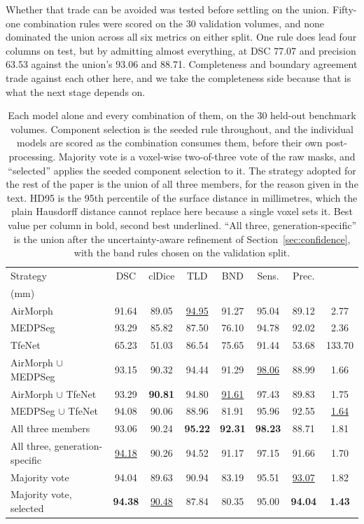 \documentclass[runningheads]{llncs}
\newcommand{\hd}[1]{\makecell[c]{#1}}
\begin{document}
Whether that trade can be avoided was tested before settling on the union.
Fifty-one combination rules were scored on the 30 validation volumes, and none
dominated the union across all six metrics on either split. One rule does lead
four columns on test, but by admitting almost everything, at DSC 77.07 and
precision 63.53 against the union's 93.06 and 88.71. Completeness and boundary
agreement trade against each other here, and we take the completeness side
because that is what the next stage depends on.

\begin{table}[tbp]
\centering
\caption{Each model alone and every combination of them, on the 30 held-out
benchmark volumes. Component selection is the seeded rule throughout, and the
individual models are scored as the combination consumes them, before their own
post-processing. Majority vote is a voxel-wise two-of-three vote of the raw
masks, and ``selected'' applies the seeded component selection to it. The
strategy adopted for the rest of the paper is the union of all three members,
for the reason given in the text. HD95 is the 95th
percentile of the surface distance in millimetres, which the plain Hausdorff
distance cannot replace here because a single voxel sets it. Best value per
column in bold, second best underlined. ``All three, generation-specific'' is the union after the uncertainty-aware refinement of Section~\ref{sec:confidence}, with the band rules chosen on the validation split.}
\label{tab:variants}
\setlength{\tabcolsep}{3.5pt}\footnotesize
\begin{tabular}{@{}lccccccc@{}}
\toprule
Strategy & DSC & clDice & TLD & BND & Sens. & Prec. & \hd{HD95\\(mm)} \\
\midrule
AirMorph & 91.64 & 89.05 & \underline{94.95} & 91.27 & 95.04 & 89.12 & 2.77 \\
MEDPSeg & 93.29 & 85.82 & 87.50 & 76.10 & 94.78 & 92.02 & 2.36 \\
TfeNet & 65.23 & 51.03 & 86.54 & 75.65 & 91.44 & 53.68 & 133.70 \\
\midrule
AirMorph $\cup$ MEDPSeg & 93.15 & 90.32 & 94.44 & 91.29 & \underline{98.06} & 88.99 & 1.66 \\
AirMorph $\cup$ TfeNet & 93.29 & \textbf{90.81} & 94.80 & \underline{91.61} & 97.43 & 89.83 & 1.75 \\
MEDPSeg $\cup$ TfeNet & 94.08 & 90.06 & 88.96 & 81.91 & 95.96 & 92.55 & \underline{1.64} \\
All three members & 93.06 & 90.24 & \textbf{95.22} & \textbf{92.31} & \textbf{98.23} & 88.71 & 1.81 \\
All three, generation-specific & \underline{94.18} & 90.26 & 94.52 & 91.17 & 97.15 & 91.66 & 1.70 \\
\midrule
Majority vote & 94.04 & 89.63 & 90.94 & 83.19 & 95.51 & \underline{93.07} & 1.82 \\
Majority vote, selected & \textbf{94.38} & \underline{90.48} & 87.84 & 80.35 & 95.00 & \textbf{94.04} & \textbf{1.43} \\
\bottomrule
\end{tabular}
\end{table}
\end{document}
